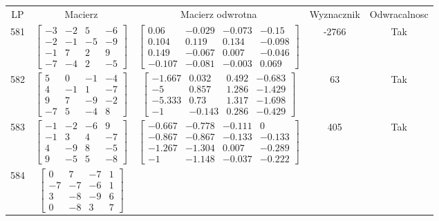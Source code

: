 \documentclass[a4paper,12pt]{article}
\begin{document}
\bgroup {} \vspace{0.2in} \begin{tabular}{c c c c c}
LP & Macierz & Macierz odwrotna & Wyznacznik & Odwracalnosc\\
581
&
$\begin{bmatrix} -3 & -2 & 5 & -6 \\ -2 & -1 & -5 & -9 \\ -1 & 7 & 2 & 9 \\ -7 & -4 & 2 & -5 \end{bmatrix}$
&
$\begin{bmatrix} 0.06 & -0.029 & -0.073 & -0.15 \\ 0.104 & 0.119 & 0.134 & -0.098 \\ 0.149 & -0.067 & 0.007 & -0.046 \\ -0.107 & -0.081 & -0.003 & 0.069 \end{bmatrix}$
&
-2766
&
Tak
\\
582
&
$\begin{bmatrix} 5 & 0 & -1 & -4 \\ 4 & -1 & 1 & -7 \\ 9 & 7 & -9 & -2 \\ -7 & 5 & -4 & 8 \end{bmatrix}$
&
$\begin{bmatrix} -1.667 & 0.032 & 0.492 & -0.683 \\ -5 & 0.857 & 1.286 & -1.429 \\ -5.333 & 0.73 & 1.317 & -1.698 \\ -1 & -0.143 & 0.286 & -0.429 \end{bmatrix}$
&
63
&
Tak
\\
583
&
$\begin{bmatrix} -1 & -2 & -6 & 9 \\ -1 & 3 & 4 & -7 \\ 4 & -9 & 8 & -5 \\ 9 & -5 & 5 & -8 \end{bmatrix}$
&
$\begin{bmatrix} -0.667 & -0.778 & -0.111 & 0 \\ -0.867 & -0.867 & -0.133 & -0.133 \\ -1.267 & -1.304 & 0.007 & -0.289 \\ -1 & -1.148 & -0.037 & -0.222 \end{bmatrix}$
&
405
&
Tak
\\
584
&
$\begin{bmatrix} 0 & 7 & -7 & 1 \\ -7 & -7 & -6 & 1 \\ 3 & -8 & -9 & 6 \\ 0 & -8 & 3 & 7 \end{bmatrix}$

\end{tabular}
\end{document}
